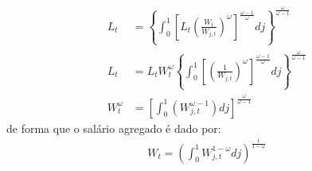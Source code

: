 \documentclass[10pt,a4paper]{article}
\begin{document}
\begin{align*}
L_t &= \left\{ \int_{0}^{1} \left[ L_t \left( \frac{W_t}{W_{j,t}} \right)^{\omega}\right]^{\frac{\omega - 1}{\omega}}dj \right\}^{\frac{\omega}{\omega - 1}}\\
L_t &= L_t W_{t}^{\omega}\left\{ \int_{0}^{1} \left[ \left( \frac{1}{W_{j,t}} \right)^{\omega}\right]^{\frac{\omega - 1}{\omega}}dj \right\}^{\frac{\omega}{\omega - 1}}\\
W_{t}^{\omega} &= \left[\int_{0}^{1} (W_{j,t}^{\omega - 1}) dj \right]^{\frac{\omega}{\omega - 1}}
\end{align*}
\noindent
de forma que o salário agregado é dado por:
\begin{align}\label{salarioAgregado}
W_{t} = \left(\int_{0}^{1} W_{j,t}^{1-\omega}dj\right)^{\frac{1}{1-\omega}}
\end{align}
\end{document}
